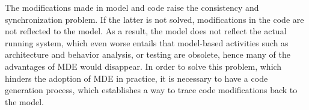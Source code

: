 \begin{comment}
In MDE tools, the regeneration of code from the changed architecture would overwrite the modifications made by programmers in code. 
Some tools such as Eclipse Modeling Framework (EMF) \cite{steinberg2008emf} separate code areas, which could be modified by the programmers, to preserve the code changes by using some specialized comments such as \ttt{@generated NOT}.
However, current separation mechanisms require the programmers to be very highly discipline.
Furthermore, even so, accidental changes are still possible \cite{zheng2012enhancing}.
The \ttt{1.x-way architecture mapping deep separation} approach \cite{zheng2012enhancing} overcome the limitations of these separation mechanisms by generating \ttt{architecture-prescribed code} in a class separating from user-code written in an other class.
However, deep separation does not allow to modify the architecture at the code level.
\end{comment}

The modifications made in model and code raise the consistency and synchronization problem.  If the latter is not solved, modifications in the code are not reflected to the model. As a result, the model does not reflect the actual running system, which even worse entails that model-based activities such as architecture and behavior analysis, or testing are obsolete, hence many of the advantages of MDE would disappear.
In order to solve this problem, which hinders the adoption of MDE in practice, it is necessary to have a code generation process, which establishes a way to trace code modifications back to the model.

